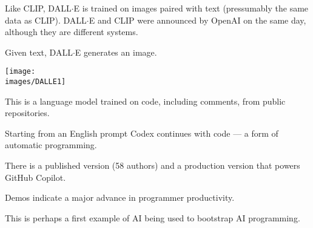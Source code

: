 {\vfill
Like CLIP, DALL$\cdot$E is trained on images paired with text (pressumably the same data as CLIP).  DALL$\cdot$E and CLIP were announced by OpenAI on the same day, although they are different systems.

\vfill
Given text, DALL$\cdot$E generates an image.



\centerline{\texttt{[image: \\images/DALLE1]}}


This is a language model trained on code, including comments, from public repositories.

\vfill
Starting from an English prompt Codex continues with code --- a form of automatic programming.

\vfill
There is a published version (58 authors) and a production version that powers GitHub Copilot.

\vfill
Demos indicate a major advance in programmer productivity.

\vfill
This is perhaps a first example of AI being used to bootstrap AI programming.


}

